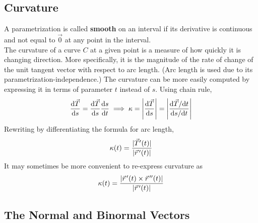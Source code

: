 \documentclass[../Calculus_\Roman{3}]{subfiles}
\begin{document}
			\subsection*{Curvature}
					A parametrization is called \textbf{smooth} on an interval if its derivative is continuous and not equal to $\vec{0}$ at any point in the interval. \\
					The curvature of a curve $C$ at a given point is a measure of how quickly it is changing direction. More specifically, it is the magnitude of the rate of change of the unit tangent vector with respect to arc length. (Arc length is used due to its parametrization-independence.)
					The curvature can be more easily computed by expressing it in terms of parameter $t$ instead of $s$. Using chain rule, 
						\[
							\frac{\mathrm{d} \vec{T}}{\mathrm{d} s} = \frac{\mathrm{d} \vec{T}}{\mathrm{d} s}\frac{\mathrm{d} s}{\mathrm{d} t}
								\implies \kappa
								= \left|\frac{\mathrm{d} \vec{T}}{\mathrm{d} s}\right|
								= \left|{\frac{\mathrm{d} \vec{T} / \mathrm{d} t}{\mathrm{d} s / \mathrm{d} t}}\right|
						\]
					Rewriting by differentiating the formula for arc length, 
						\[\kappa(t) = \frac{|\vec{T}'(t)|}{|\vec{r}\hspace{0.5mm}'(t)|}\]
					It may sometimes be more convenient to re-express curvature as
						\[\kappa(t) = \frac{|\vec{r}\hspace{0.5mm}'(t) \times \vec{r}\hspace{0.5mm}''(t)|}{|\vec{r}\hspace{0.5mm}'(t)|}\]
				\subsection*{The Normal and Binormal Vectors}
\end{document}
